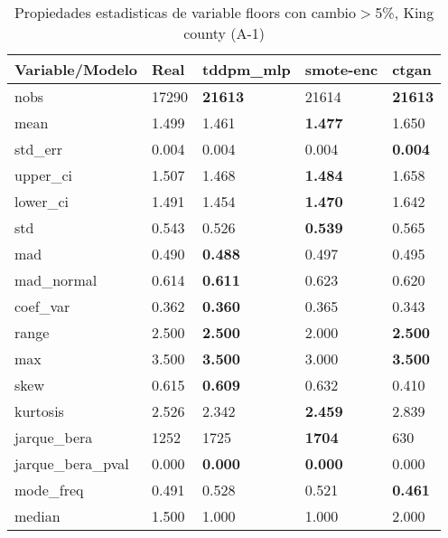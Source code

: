 \begin{table}[H]
\centering
\fontsize{8}{14}\selectfont
\caption{Propiedades estadisticas de variable floors con cambio\ensuremath{>}5\%, King county (A-1)}
\label{table-stats-king county-a-1-floors-short}
\begin{tabular}{|l|m{10em}|m{10em}|m{10em}|m{10em}|}
\hline
 \rowcolor[gray]{0.8}
Variable/Modelo & Real & tddpm\_mlp & smote-enc & ctgan \\
\hline nobs & 17290 & \bfseries 21613 & \cellcolor[rgb]{0.9, 0.54, 0.52} 21614 & \bfseries 21613 \\
\hline mean & 1.499 & 1.461 & \bfseries 1.477 & \cellcolor[rgb]{0.9, 0.54, 0.52} 1.650 \\
\hline std\_err & 0.004 & \cellcolor[rgb]{0.9, 0.54, 0.52} 0.004 & 0.004 & \bfseries 0.004 \\
\hline upper\_ci & 1.507 & 1.468 & \bfseries 1.484 & \cellcolor[rgb]{0.9, 0.54, 0.52} 1.658 \\
\hline lower\_ci & 1.491 & 1.454 & \bfseries 1.470 & \cellcolor[rgb]{0.9, 0.54, 0.52} 1.642 \\
\hline std & 0.543 & 0.526 & \bfseries 0.539 & \cellcolor[rgb]{0.9, 0.54, 0.52} 0.565 \\
\hline mad & 0.490 & \bfseries 0.488 & \cellcolor[rgb]{0.9, 0.54, 0.52} 0.497 & 0.495 \\
\hline mad\_normal & 0.614 & \bfseries 0.611 & \cellcolor[rgb]{0.9, 0.54, 0.52} 0.623 & 0.620 \\
\hline coef\_var & 0.362 & \bfseries 0.360 & 0.365 & \cellcolor[rgb]{0.9, 0.54, 0.52} 0.343 \\
\hline range & 2.500 & \bfseries 2.500 & \cellcolor[rgb]{0.9, 0.54, 0.52} 2.000 & \bfseries 2.500 \\
\hline max & 3.500 & \bfseries 3.500 & \cellcolor[rgb]{0.9, 0.54, 0.52} 3.000 & \bfseries 3.500 \\
\hline skew & 0.615 & \bfseries 0.609 & 0.632 & \cellcolor[rgb]{0.9, 0.54, 0.52} 0.410 \\
\hline kurtosis & 2.526 & 2.342 & \bfseries 2.459 & \cellcolor[rgb]{0.9, 0.54, 0.52} 2.839 \\
\hline jarque\_bera & 1252 & 1725 & \bfseries 1704 & \cellcolor[rgb]{0.9, 0.54, 0.52} 630 \\
\hline jarque\_bera\_pval & 0.000 & \bfseries 0.000 & \bfseries 0.000 & \cellcolor[rgb]{0.9, 0.54, 0.52} 0.000 \\
\hline mode\_freq & 0.491 & \cellcolor[rgb]{0.9, 0.54, 0.52} 0.528 & 0.521 & \bfseries 0.461 \\
\hline median & 1.500 & 1.000 & 1.000 & 2.000 \\
\hline
\end{tabular}
\end{table}

